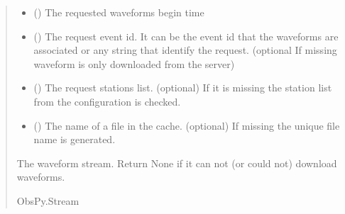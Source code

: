 \documentclass[letterpaper,10pt,english]{sphinxmanual}
\begin{document}
\begin{fulllineitems}
\begin{fulllineitems}
\begin{quote}
\begin{description}
\begin{itemize}
\item {} 
\sphinxAtStartPar
{} () \textendash{} The requested waveforms begin time

\item {} 
\sphinxAtStartPar
{} () \textendash{} The request event id. It can be the event id that the waveforms are associated
or any string that identify the request. (optional If missing waveform is only downloaded from the server)

\item {} 
\sphinxAtStartPar
{} (\sphinxstyleliteralemphasis{\sphinxupquote{(}}\sphinxstyleliteralemphasis{\sphinxupquote{)}}) \textendash{} The request stations list.
(optional) If it is missing the station list from the configuration is checked.

\item {} 
\sphinxAtStartPar
{} () \textendash{} The name of a file in the cache.
(optional) If missing the unique file name is generated.

\end{itemize}

\sphinxAtStartPar
The waveform stream. Return None if it can not (or could not) download waveforms.

\sphinxAtStartPar
ObsPy.Stream

\end{description}\end{quote}

\end{fulllineitems}


\end{fulllineitems}

\end{document}
